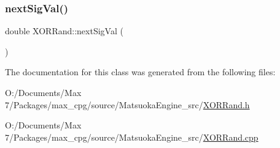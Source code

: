 \mbox{\label{classXORRand_a18ba05ab627075c54de5779e43fb599c}} 
\subsubsection{\texorpdfstring{next\+Sig\+Val()}{nextSigVal()}}
{\footnotesize\ttfamily double X\+O\+R\+Rand\+::next\+Sig\+Val (\begin{DoxyParamCaption}{ }\end{DoxyParamCaption})\hspace{0.3cm}{\ttfamily [static]}}



The documentation for this class was generated from the following files\+:\begin{DoxyCompactItemize}
\item 
O\+:/\+Documents/\+Max 7/\+Packages/max\+\_\+cpg/source/\+Matsuoka\+Engine\+\_\+src/\mbox{\hyperlink{XORRand_8h}{X\+O\+R\+Rand.\+h}}\item 
O\+:/\+Documents/\+Max 7/\+Packages/max\+\_\+cpg/source/\+Matsuoka\+Engine\+\_\+src/\mbox{\hyperlink{XORRand_8cpp}{X\+O\+R\+Rand.\+cpp}}\end{DoxyCompactItemize}
